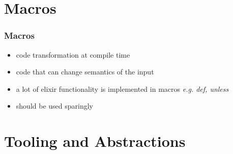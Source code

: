 \documentclass{beamer}
\begin{document}
\section[Section]{Macros}

\begin{frame}
  \frametitle{Macros}
  \begin{itemize}
  \item code transformation at compile time
  \item code that can change semantics of the input
  \item a lot of elixir functionality is implemented in macros \textsl{e.g. def, unless}
  \item should be used sparingly
  \end{itemize}
\end{frame}

\section[Section]{Tooling and Abstractions}
  
\end{document}
